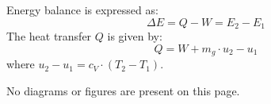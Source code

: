 Energy balance is expressed as:  
\[
\Delta E = Q - W = E_2 - E_1
\]  
The heat transfer \( Q \) is given by:  
\[
Q = W + m_g \cdot u_2 - u_1
\]  
where \( u_2 - u_1 = c_V \cdot (T_2 - T_1) \).  

No diagrams or figures are present on this page.